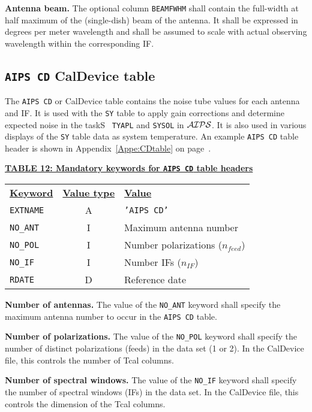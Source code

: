 \documentclass[twoside]{article}
\newcommand{\Hi}[1]{\textcolor{hicol}{#1}}
\newcommand{\AIPS}{{$\cal AIPS\/$}}
\newcommand{\npol}{$n_{feed}$}
\newcommand{\nif}{$n_{IF}$}
\begin{document}
{\bf Antenna beam.} The optional column {\tt BEAMFWHM} shall contain
the full-width at half maximum of the (single-dish) beam of the
antenna.  It shall be expressed in degrees per meter wavelength and
shall be assumed to scale with actual observing wavelength within the
corresponding IF.

\subsection{{\tt AIPS CD} CalDevice table}
\label{s:CD}

The {\tt AIPS CD} or CalDevice table contains the noise tube values
for each antenna and IF\@.  It is used with the {\tt SY} table to
apply gain corrections and determine expected noise in the taskS {\tt
TYAPL} \Hi{and {\tt SYSOL}} in \AIPS\@.  It is also used in various
displays of the {\tt SY} table data as system temperature.  An example
{\tt AIPS CD} table header is shown in Appendix~\ref{Appe:CDtable} on
page~\pageref{Appe:CDtable}.

\begin{center}
\underline{\bf{TABLE 12: Mandatory keywords for {\tt AIPS CD} table
    headers}}\\
\begin{tabular}{lcl}
\noalign{\vspace{2pt}} \label{ta:CDkeys}
\underline{{\bf Keyword}} & \underline{\bf{Value type}} &
    \underline{\bf{Value\vphantom{y}}} \\
\noalign{\vspace{2pt}}
{\tt EXTNAME}   & A & {\tt 'AIPS CD'}  \\
{\tt NO\_ANT}   & I & Maximum antenna number \\
{\tt NO\_POL}   & I & Number polarizations (\npol) \\
{\tt NO\_IF}    & I & Number IFs (\nif) \\
{\tt RDATE}     & D & Reference date
\end{tabular}
\end{center}

{\bf Number of antennas.} The value of the {\tt NO\_ANT} keyword shall
specify the maximum antenna number to occur in the {\tt AIPS CD} table.

{\bf Number of polarizations.} The value of the {\tt NO\_POL}
keyword shall specify the number of distinct polarizations (feeds) in
the data set (1 or 2).  In the CalDevice file, this controls the
number of Tcal columns.

{\bf Number of spectral windows.} The value of the {\tt NO\_IF}
keyword shall specify the number of spectral windows (IFs) in the data
set.  In the CalDevice file, this controls the dimension of the
Tcal columns.
\end{document}
